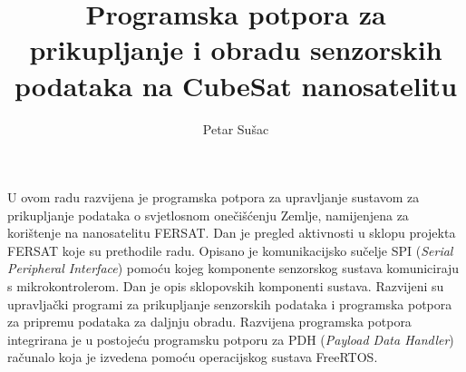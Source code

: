 \documentclass[times, utf8, zavrsni, numeric]{fer}
\begin{document}

\title{Programska potpora za prikupljanje i obradu senzorskih podataka na CubeSat nanosatelitu}

\author{Petar Sušac}


%

\zahvala{}

\tableofcontents










\begin{sazetak}
U ovom radu razvijena je programska potpora za upravljanje sustavom za prikupljanje podataka o svjetlosnom onečišćenju Zemlje, namijenjena za korištenje na nanosatelitu FERSAT. Dan je pregled aktivnosti u sklopu projekta FERSAT koje su prethodile radu. Opisano je komunikacijsko sučelje SPI (\textit{Serial Peripheral Interface}) pomoću kojeg komponente senzorskog sustava komuniciraju s mikrokontrolerom. Dan je opis sklopovskih komponenti sustava. Razvijeni su upravljački programi za prikupljanje senzorskih podataka i programska potpora za pripremu podataka za daljnju obradu. Razvijena programska potpora integrirana je u postojeću programsku potporu za PDH (\textit{Payload Data Handler}) računalo koja je izvedena pomoću operacijskog sustava FreeRTOS.

\end{sazetak}
\end{document}
